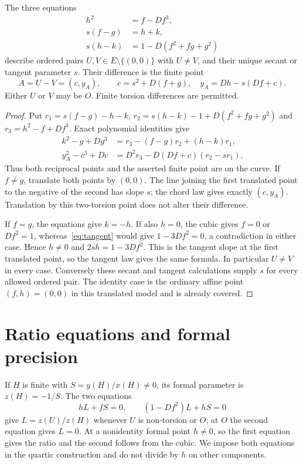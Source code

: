 \documentclass[11pt,a4paper]{article}
\begin{document}
\begin{proposition}\label{prop:pair}
The three equations
\begin{align}
 h^2&=f-Df^3,\\
 s(f-g)&=h+k,\\
 s(h-k)&=1-D(f^2+fg+g^2)\label{eq:tangent}
\end{align}
describe ordered pairs $U,V\in E\setminus\{(0,0)\}$ with $U\ne V$,
and their unique secant or tangent parameter $s$. Their difference
is the finite point
\[
 A=U-V=(c,y_A),\qquad
 c=s^2+D(f+g),\quad y_A=Dh-s(Df+c).
\]
Either $U$ or $V$ may be $O$. Finite torsion differences are permitted.
\end{proposition}
\begin{proof}
Put $r_1=s(f-g)-h-k$, $r_2=s(h-k)-1+D(f^2+fg+g^2)$ and
$r_3=h^2-f+Df^3$. Exact polynomial identities give
\begin{align*}
 k^2-g+Dg^3&=r_3-(f-g)r_2+(h-k)r_1,\\
 y_A^2-c^3+Dc&=D^2r_3-D(Df+c)(r_2-sr_1).
\end{align*}
Thus both reciprocal points and the asserted finite point are on the
curve. If $f\ne g$, translate both points by $(0,0)$. The line
joining the first translated point to the negative of the second has
slope $s$; the chord law gives exactly $(c,y_A)$. Translation by this
two-torsion point does not alter their difference.

If $f=g$, the equations give $k=-h$. If also $h=0$, the cubic gives
$f=0$ or $Df^2=1$, whereas~\eqref{eq:tangent} would give
$1-3Df^2=0$, a contradiction in either case. Hence $h\ne0$ and
$2sh=1-3Df^2$. This is the tangent slope at the first translated
point, so the tangent law gives the same formula. In particular
$U\ne V$ in every case. Conversely these secant and tangent
calculations supply $s$ for every allowed ordered pair. The identity
case is the ordinary affine point $(f,h)=(0,0)$ in this translated
model and is already covered.
\end{proof}

\section{Ratio equations and formal precision}
If $H$ is finite with $S=y(H)/x(H)\ne0$, its formal parameter is
$z(H)=-1/S$. The two equations
\[
              hL+fS=0,\qquad (1-Df^2)L+hS=0
\]
give $L=z(U)/z(H)$ whenever $U$ is non-torsion or $O$; at $O$ the
second equation gives $L=0$. At a nonidentity formal point $h\ne0$,
so the first equation gives the ratio and the second follows from the
cubic. We impose both equations in the quartic construction and do
not divide by $h$ on other components.
\end{document}
